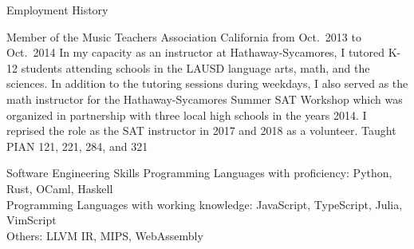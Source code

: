 \documentclass{cv}
\begin{document}
\begin{block}{Employment History}
  \begin{entries}
      {Member of the Music Teachers Association California from Oct.\ 2013 to Oct.\ 2014}
      {In my capacity as an instructor at Hathaway-Sycamores, I tutored K-12
      students attending schools in the LAUSD language arts, math, and the
      sciences. In addition to the tutoring sessions during weekdays, I also
      served as the math instructor for the Hathaway-Sycamores Summer SAT Workshop
      which was organized in partnership with three local high schools in the
      years 2014. I reprised the role as the SAT instructor in 2017
      and 2018 as a volunteer.}
      {Taught PIAN 121, 221, 284, and 321}
  \end{entries}
\end{block}

\begin{block}{Software Engineering Skills}
  Programming Languages with proficiency: Python, Rust, OCaml, Haskell\\
  Programming Languages with working knowledge: JavaScript, TypeScript, Julia, VimScript\\
  Others: LLVM IR, MIPS, WebAssembly
\end{block}

\begin{refsection}[papers]
  \nocite{*}
  \printbibliography[title=Peer Reviewed Publications]
\end{refsection}

\begin{refsection}[talks]
  \nocite{*}
  \printbibliography[title=Talks and Presentations]
\end{refsection}
\end{document}
